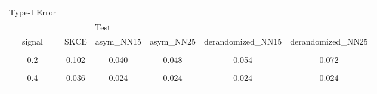 \begin{table}[!h]
\centering\begingroup\fontsize{5}{7}\selectfont

\begin{tabular}{cccccc}
\toprule
\multicolumn{1}{c}{Type-I Error} \\
\cmidrule(l{3pt}r{3pt}){1-1}
\multicolumn{1}{c}{ } & \multicolumn{2}{c}{Test} \\
\cmidrule(l{3pt}r{3pt}){2-3}
signal & SKCE & asym_NN15 & asym_NN25 & derandomized_NN15 & derandomized_NN25\\
\midrule
\cellcolor{gray!10}{0.1} & \cellcolor{gray!10}{0.086} & \cellcolor{gray!10}{0.066} & \cellcolor{gray!10}{0.068} & \cellcolor{gray!10}{0.060} & \cellcolor{gray!10}{0.066}\\
0.2 & 0.102 & 0.040 & 0.048 & 0.054 & 0.072\\
\cellcolor{gray!10}{0.3} & \cellcolor{gray!10}{0.070} & \cellcolor{gray!10}{0.054} & \cellcolor{gray!10}{0.054} & \cellcolor{gray!10}{0.058} & \cellcolor{gray!10}{0.040}\\
0.4 & 0.036 & 0.024 & 0.024 & 0.024 & 0.024\\
\cellcolor{gray!10}{0.5} & \cellcolor{gray!10}{0.062} & \cellcolor{gray!10}{0.040} & \cellcolor{gray!10}{0.040} & \cellcolor{gray!10}{0.056} & \cellcolor{gray!10}{0.032}\\
\bottomrule
\end{tabular}
\endgroup{}
\end{table}
